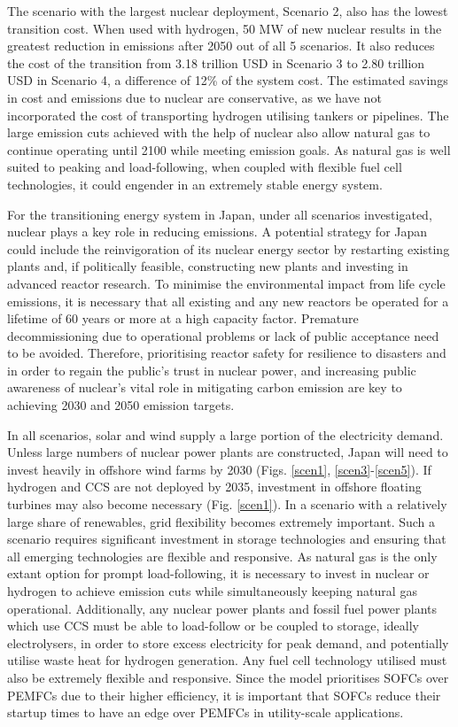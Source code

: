 The scenario with the largest nuclear deployment, Scenario 2, also has the lowest transition cost. When used with hydrogen, 50 MW of new nuclear results in the greatest reduction in emissions after 2050 out of all 5 scenarios. It also reduces the cost of the transition from 3.18 trillion USD in Scenario 3 to 2.80 trillion USD in Scenario 4, a difference of 12\% of the system cost. The estimated savings in cost and emissions due to nuclear are conservative, as we have not incorporated the cost of transporting hydrogen utilising tankers or pipelines. The large emission cuts achieved with the help of nuclear also allow natural gas to continue operating until 2100 while meeting emission goals. As natural gas is well suited to peaking and load-following, when coupled with flexible fuel cell technologies, it could engender in an extremely stable energy system. 

For the transitioning energy system in Japan, under all scenarios investigated, nuclear plays a key role in reducing emissions. A potential strategy for Japan could include the reinvigoration of its nuclear energy sector by restarting existing plants and, if politically feasible, constructing new plants and investing in advanced reactor research. To minimise the environmental impact from life cycle emissions, it is necessary that all existing and any new reactors be operated for a lifetime of 60 years or more at a high capacity factor. Premature decommissioning due to operational problems or lack of public acceptance need to be avoided. Therefore, prioritising reactor safety for resilience to disasters and in order to regain the public's trust in nuclear power, and increasing public awareness of nuclear's vital role in mitigating carbon emission are key to achieving 2030 and 2050 emission targets.

In all scenarios, solar and wind supply a large portion of the electricity demand. Unless large numbers of nuclear power plants are constructed, Japan will need to invest heavily in offshore wind farms by 2030 (Figs. \ref{scen1}, \ref{scen3}-\ref{scen5}). If hydrogen and CCS are not deployed by 2035, investment in offshore floating turbines may also become necessary (Fig. \ref{scen1}). In a scenario with a relatively large share of renewables, grid flexibility becomes extremely important. Such a scenario requires significant investment in storage technologies and ensuring that all emerging technologies are flexible and responsive. As natural gas is the only extant option for prompt load-following, it is necessary to invest in nuclear or hydrogen to achieve emission cuts while simultaneously keeping natural gas operational. Additionally, any nuclear power plants and fossil fuel power plants which use CCS must be able to load-follow or be coupled to storage, ideally electrolysers, in order to store excess electricity for peak demand, and potentially utilise waste heat for hydrogen generation. Any fuel cell technology utilised must also be extremely flexible and responsive. Since the model prioritises \gls{SOFC}s over \gls{PEMFC}s due to their higher efficiency, it is important that \gls{SOFC}s reduce their startup times to have an edge over \gls{PEMFC}s in utility-scale applications.


